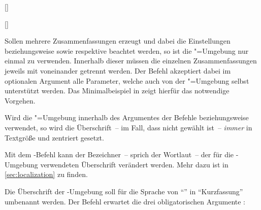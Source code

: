\begin{Declaration*}{}
\begin{Declaration*}{}
\begin{Declaration*}{}
\begin{Declaration}{[]}
\begin{Declaration}{[]}
\begin{Declaration}{}
\begin{Declaration}[v2.02]{}
\begin{Declaration}[v2.02]{%
}
\begin{Declaration}{}
\begin{Declaration}{}{%
}
Sollen mehrere Zusammenfassungen erzeugt und dabei die Einstellungen 
 beziehungsweise  sowie 
 respektive  beachtet werden, so 
ist die "=Umgebung nur einmal zu verwenden. Innerhalb 
dieser müssen die einzelnen Zusammenfassungen jeweils mit  
voneinander getrennt werden. Der Befehl akzeptiert dabei im optionalen Argument 
alle Parameter, welche auch von der "=Umgebung selbst 
unterstützt werden. Das Minimalbeispiel in  
zeigt hierfür das notwendige Vorgehen.

Wird die "=Umgebung innerhalb des Argumentes der Befehle 
 beziehungsweise  verwendet, 
so wird die Überschrift~-- im Fall, dass nicht  gewählt 
ist~-- \emph{immer} in Textgröße und zentriert gesetzt.
\end{Declaration}
\end{Declaration}
\end{Declaration}
\end{Declaration}
\end{Declaration}
\end{Declaration}
\end{Declaration}

Mit dem \KOMAScript-Befehl  kann der Bezeichner~-- 
sprich der Wortlaut~-- der für die -Umgebung verwendeten 
Überschrift verändert werden. Mehr dazu ist in \autoref{sec:localization} zu 
finden.
%
\begin{Example}
Die Überschrift der -Umgebung soll für die Sprache 
 von \enquote{\abstractname} in \enquote{Kurzfassung} umbenannt 
werden. Der Befehl  erwartet die drei obligatorischen 
Argumente :
\begin{Code}[escapechar=§]
\end{Code}
%
\end{Example}



\end{Declaration*}
\end{Declaration*}
\end{Declaration*}

